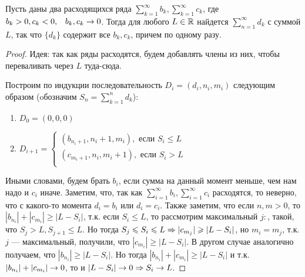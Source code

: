 \begin{lemma}
    Пусть даны два расходящихся ряда \(\sum_{k = 1}^\infty b_k, \sum_{k = 1}^\infty c_k\), где \(b_k > 0, c_k < 0,\;\;\;b_k, c_k \rightarrow 0\). Тогда для любого \(L \in \mathbb{R}\) найдется \(\sum_{n = 1}^\infty d_k\) с суммой \(L\), так что \(\{d_k\}\) содержит все \(b_k, c_k\), причем по одному разу.
\end{lemma}
\begin{proof}
    Идея: так как ряды расходятся, будем добавлять члены из них, чтобы переваливать через \(L\) туда-сюда. %

    Построим по индукции последовательность \(D_i = (d_i, n_i, m_i)\) следующим образом (oбозначим \(S_n = \sum_{k = 1}^n d_k\)):
    \begin{enumerate}
        \item[] \(D_0 = (0, 0, 0)\)
        \item[] \(D_{i + 1} = \left\{\begin{array}{l}
            (b_{n_i + 1}, n_i + 1, m_i), \text{ если }S_i \le L \\
            (c_{m_i + 1}, n_i, m_i + 1), \text{ если }S_i > L \\
        \end{array}\right.\)
    \end{enumerate}
    Иными словами, будем брать \(b_i\), если сумма на данный момент меньше, чем нам надо и \(c_i\) иначе.
    Заметим, что, так как \(\sum_{i = 1}^\infty b_i, \sum_{i = 1}^\infty c_i\) расходятся, то неверно, что с какого-то момента \(d_i = b_i\) или \(d_i = c_i\). Также заметим, что если \(n, m > 0\), то \(|b_{n_i}| + |c_{m_i}| \ge \left|L - S_i\right|\), т.к. если \( S_i \le L\), то рассмотрим максимальный \(j:\), такой, что \(S_j > L, S_{j + 1} \le L\). Но тогда \(S_j \leqslant S_i \leqslant L \Rightarrow |c_{m_j}| \geqslant \left|L - S_i\right|\), но \(m_i = m_j\), т.к. \(j\) --- максимальный, получили, что \(|c_{m_i}| \ge \left|L - S_i\right|\). В другом случае аналогично получаем, что \(|b_{n_i}| \ge \left|L - S_i\right|\). Но тогда \(|b_{n_i}| + |c_{m_i}| \ge \left|L - S_i\right|\) и т.к. \(|b_{n_i}| + |c_{m_i}| \rightarrow 0\), то и \(\left|L - S_i\right| \rightarrow 0 \Rightarrow S_i \rightarrow L\).
\end{proof}